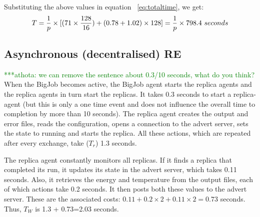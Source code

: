 \documentclass{rspublic}
\newcommand{\alnote}[1]{ {\textcolor{blue} { ***andre: #1 }}}
\newcommand{\athotanote}[1]{ {\textcolor{green} { ***athota: #1 }}}
\newcommand{\alnote}[1]{}
\newcommand{\athotanote}[1]{}
\begin{document}
{Substituting the above values in equation ~\ref{eq:totaltime}, we get:
\begin{eqnarray}
T=  {1 \over p} \times {[ {(71\times {128\over 16}}) + (0.78 + 1.02)\times 128]} = {1 \over p} \times 798.4~seconds
\label{eq:cent}
\end{eqnarray}


\subsection{Asynchronous (decentralised) RE}

\athotanote{we can remove the sentence about 0.3/10 seconds, what do you think?}When the BigJob becomes active, the BigJob agent starts the replica
agents and the replica agents in turn start the replicas. It takes 0.3
seconds to start a replica-agent (but this is only a one time event and does not influence the overall time to completion by more than 10 seconds). The replica agent creates the
output and error files, reads the configuration, opens a connection to the advert server, sets the state to running and starts the
replica. All these actions, which are repeated after every exchange,
take ($T_r$) 1.3 seconds. 

The replica agent constantly monitors all replicas. If it finds
a replica that completed its run, it updates its state in the advert
server, which takes 0.11 seconds. 
Also, it retrieves the energy and
temperature from the output files, each of which actions take 0.2
seconds. It then posts both these values to the advert server. These are the associated costs: $0.11+0.2\times2+0.11\times2=0.73$ seconds.  Thus,
$T_W$ is 1.3 + 0.73=2.03 seconds. %


}
\end{document}
